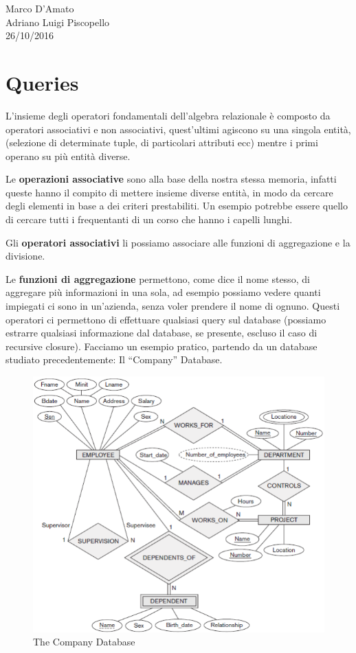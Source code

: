 \begin{flushright}Marco D'Amato\\Adriano Luigi Piscopello\\26/10/2016\end{flushright}


\section{Queries}

L’insieme degli operatori fondamentali dell’algebra relazionale è composto da operatori associativi e non associativi, quest’ultimi agiscono su una singola entità, (selezione di determinate tuple, di particolari attributi ecc) mentre i primi operano su più entità diverse.  

Le \textbf{operazioni associative} sono alla base della nostra stessa memoria, infatti queste hanno il compito di mettere insieme diverse entità, in modo da cercare degli elementi in base a dei criteri prestabiliti. Un esempio potrebbe essere quello di cercare tutti i frequentanti di un corso che hanno i capelli lunghi. 
 
Gli \textbf{operatori associativi} li possiamo associare alle funzioni di aggregazione e la divisione.  

Le \textbf{funzioni di aggregazione} permettono, come dice il nome stesso, di aggregare più informazioni in una sola, ad esempio possiamo vedere quanti impiegati ci sono in un’azienda, senza voler prendere il nome di ognuno. Questi operatori ci permettono di effettuare qualsiasi query sul database (possiamo estrarre qualsiasi informazione dal database, se presente, escluso il caso di recursive closure). Facciamo un esempio pratico, partendo da un database studiato precedentemente: Il “Company” Database.   

\begin{center}
\begin{figure}[H]
\centering
\includegraphics[scale=0.7]{figures/tcd2.png}
\caption{The Company Database} 
\end{figure}
\end{center}

